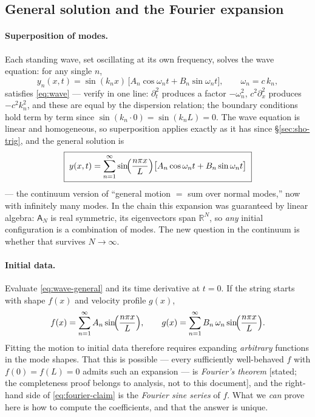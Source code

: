\documentclass[11pt]{article}
\theoremstyle{plain}
\theoremstyle{definition}
\theoremstyle{remark}
\newcommand{\mA}{\mathsf{A}}
\begin{document}
\subsection{General solution and the Fourier expansion}
\label{sec:fourier}

\paragraph{Superposition of modes.}
Each standing wave, set oscillating at its own frequency, solves the wave
equation: for any single $n$,
\begin{equation}
  y_n(x,t) = \sin(k_n x)\,\bigl[A_n\cos\omega_n t + B_n \sin\omega_n t\bigr],
  \qquad \omega_n = c\,k_n ,
\end{equation}
satisfies \eqref{eq:wave} --- verify in one line:
$\partial_t^2$ produces a factor $-\omega_n^2$, $c^2\partial_x^2$ produces
$-c^2 k_n^2$, and these are equal by the dispersion relation; the boundary
conditions hold term by term since $\sin(k_n\cdot 0)=\sin(k_n L) = 0$.
The wave equation is linear and homogeneous, so superposition applies
exactly as it has since \S\ref{sec:sho-trig}, and the general solution is
\begin{equation}
  \boxed{\;
  y(x,t) = \sum_{n=1}^{\infty} \sin\!\Bigl(\frac{n\pi x}{L}\Bigr)
  \bigl[A_n\cos\omega_n t + B_n \sin\omega_n t\bigr]
  \;}
  \label{eq:wave-general}
\end{equation}
--- the continuum version of ``general motion $=$ sum over normal modes,''
now with infinitely many modes. In the chain this expansion was guaranteed
by linear algebra: $\mA_N$ is real symmetric, its eigenvectors span
$\mathbb{R}^N$, so \emph{any} initial configuration is a combination of
modes. The new question in the continuum is whether that survives
$N\to\infty$.

\paragraph{Initial data.}
Evaluate \eqref{eq:wave-general} and its time derivative at $t=0$. If the
string starts with shape $f(x)$ and velocity profile $g(x)$,
\begin{equation}
  f(x) = \sum_{n=1}^\infty A_n \sin\!\Bigl(\frac{n\pi x}{L}\Bigr),
  \qquad
  g(x) = \sum_{n=1}^\infty B_n\,\omega_n \sin\!\Bigl(\frac{n\pi x}{L}\Bigr).
  \label{eq:fourier-claim}
\end{equation}
Fitting the motion to initial data therefore requires expanding
\emph{arbitrary} functions in the mode shapes. That this is possible ---
every sufficiently well-behaved $f$ with $f(0)=f(L)=0$ admits such an
expansion --- is \emph{Fourier's theorem} [stated; the completeness proof belongs
to analysis, not to this document], and the right-hand side of
\eqref{eq:fourier-claim} is the \emph{Fourier sine series} of $f$. What
we \emph{can} prove here is how to compute the coefficients, and that
the answer is unique.
\end{document}

